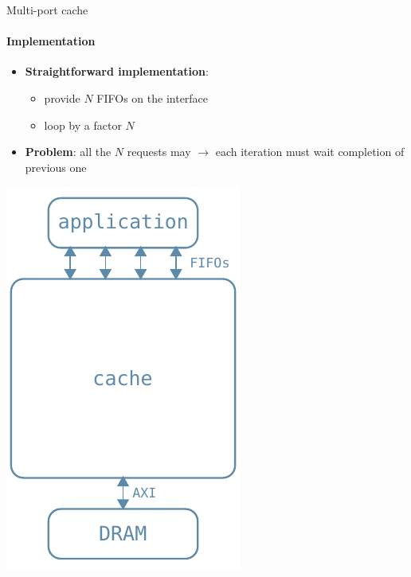\documentclass[handout,aspectratio=169]{beamer}
\begin{document}
\begin{frame}{Multi-port cache}
	\framesubtitle{Implementation}
	\begin{minipage}{.7\textwidth}
		\begin{itemize}[<+->]
			\item \textbf{Straightforward implementation}:
				\begin{itemize}[<.->]
					\item provide $N$ FIFOs on the interface
					\item {}
						loop by a factor $N$
				\end{itemize}
			\item \textbf{Problem}: all the $N$ requests may
				$\rightarrow$ each iteration must wait completion of
				previous one
		\end{itemize}
	\end{minipage}
	\begin{minipage}{.28\textwidth}
		\begin{center}
			\includegraphics[width=.8\textwidth]{multiport_arch.pdf}
		\end{center}
	\end{minipage}
\end{frame}
\end{document}
